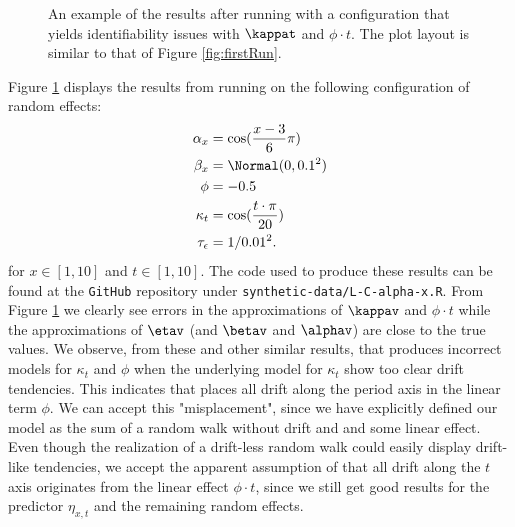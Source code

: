 \begin{figure}[h!]
    \caption{An example of the results after running \inlabru with a configuration that yields identifiability issues with $\kappat$ and $\phi \cdot t$. The plot layout is similar to that of Figure \ref{fig:firstRun}.}
    \label{fig:unidentifiabilityKappa}
\end{figure}
Figure \ref{fig:unidentifiabilityKappa} displays the results from running \inlabru on the following configuration of random effects:
\begin{equation}
    \begin{aligned}
    \alpha_x &= \cos(\frac{x-3}{6}\pi)\\
    \beta_x &= \Normal(0,0.1^2)\\
    \phi &= -0.5\\
    \kappa_t &= \cos(\frac{t\cdot \pi}{20})\\
    \tau_{\epsilon} &= 1/0.01^2.
    \end{aligned}
\end{equation}
for $x\in[1,10]$ and $t\in[1,10]$. The code used to produce these results can be found at the \texttt{GitHub} repository under \texttt{synthetic-data/L-C-alpha-x.R}. From Figure \ref{fig:unidentifiabilityKappa} we clearly see errors in the approximations of $\kappav$ and $\phi\cdot t$ while the approximations of $\etav$ (and $\betav$ and $\alphav$) are close to the true values. We observe, from these and other similar results, that \inlabru produces incorrect models for $\kappa_t$ and $\phi$ when the underlying model for $\kappa_t$ show too clear drift tendencies. This indicates that \inlabru places all drift along the period axis in the linear term $\phi$. We can accept this "misplacement", since we have explicitly defined our model as the sum of a random walk without drift and and some linear effect. Even though the realization of a drift-less random walk could easily display drift-like tendencies, we accept the apparent assumption of \inlabru that all drift along the $t$ axis originates from the linear effect $\phi \cdot t$, since we still get good results for the predictor $\eta_{x,t}$ and the remaining random effects.
\newline
